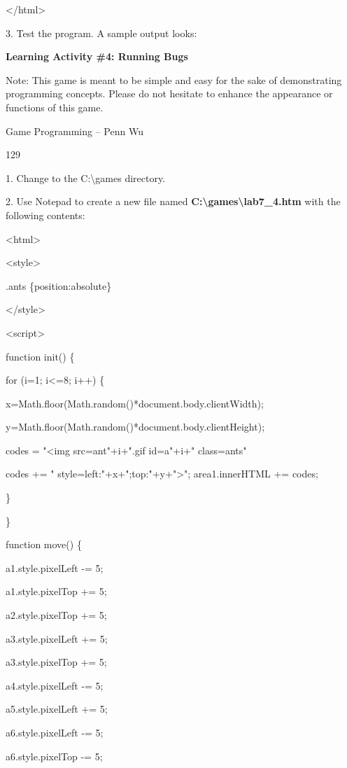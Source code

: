 \documentclass[
]{article}
\begin{document}
\textless/html\textgreater{}

3. Test the program. A sample output looks:

\textbf{Learning Activity \#4: Running Bugs}

Note: This game is meant to be simple and easy for the sake of
demonstrating programming concepts. Please do not hesitate to enhance
the appearance or functions of this game.

Game Programming -- Penn Wu

129

\protect\hypertarget{index_split_008.htmlux5cux23p130}{}{}

1. Change to the C:\textbackslash games directory.

2. Use Notepad to create a new file named
\textbf{C:\textbackslash games\textbackslash lab7\_4.htm} with the
following contents:

\textless html\textgreater{}

\textless style\textgreater{}

.ants \{position:absolute\}

\textless/style\textgreater{}

\textless script\textgreater{}

function init() \{

for (i=1; i\textless=8; i++) \{

x=Math.floor(Math.random()*document.body.clientWidth);

y=Math.floor(Math.random()*document.body.clientHeight);

codes = "\textless img src=ant"+i+".gif id=a"+i+" class=ants"

codes += "
style=\textquotesingle left:"+x+";top:"+y+"\textquotesingle\textgreater";
area1.innerHTML += codes;

\}

\}

function move() \{

a1.style.pixelLeft -= 5;

a1.style.pixelTop += 5;

a2.style.pixelTop += 5;

a3.style.pixelLeft += 5;

a3.style.pixelTop += 5;

a4.style.pixelLeft -= 5;

a5.style.pixelLeft += 5;

a6.style.pixelLeft -= 5;

a6.style.pixelTop -= 5;
\end{document}
